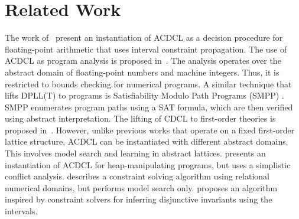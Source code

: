 \section{Related Work}
The work of~\cite{sas13,DBLP:journals/fmsd/BrainDGHK14} present an
instantiation of ACDCL as a decision procedure for floating-point
arithmetic that uses interval constraint propagation.  
%
The use of
ACDCL as program analysis is proposed in~\cite{tacas12}.  The analysis
operates over the abstract domain of floating-point numbers and
machine integers.  Thus, it is restricted to bounds checking for
numerical programs.  
%
A similar technique that lifts DPLL(T) to
programs is Satisfiability Modulo Path Programs (SMPP) \cite{SMPP}. SMPP
enumerates program paths using a SAT formula, which are then verified
using abstract interpretation.  
%
The lifting of CDCL to first-order theories is proposed
in~\cite{dpll,cp09,ndsmt}.
%
 However, unlike
previous works that operate on a fixed first-order lattice structure,
ACDCL can be instantiated with different abstract domains.  This
involves model search and learning in abstract lattices.   
%
\cite{DBLP:journals/fmsd/BrainDGHK14} presents an instantiation of ACDCL for
heap-manipulating programs, but uses a simplistic conflict analysis.
%
\cite{DBLP:conf/vmcai/PelleauMTB13} describes a constraint solving algorithm
using relational numerical domains, but performs model search only.
%
\cite{DBLP:conf/esop/MineBR16} proposes an algorithm inspired by constraint
solvers for inferring disjunctive invariants using the intervals.
%

